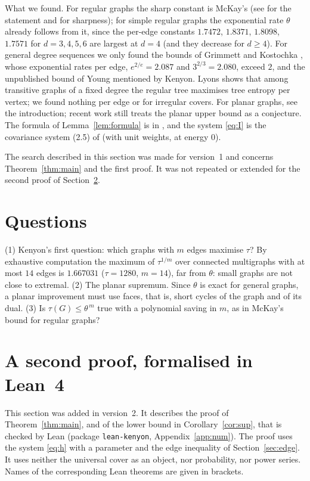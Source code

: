 \documentclass[11pt]{amsart}
\theoremstyle{plain}
\theoremstyle{remark}
\newcommand{\code}[1]{\texttt{#1}}
\newcommand{\tht}{\theta}
\begin{document}
What we found. For regular graphs the sharp constant is McKay's \cite{McKay} (see \cite{GIKM} for the statement
and \cite{ChungYau} for sharpness); for simple regular graphs the exponential rate $\tht$ already follows from it,
since the per-edge constants $1.7472$, $1.8371$, $1.8098$, $1.7571$ for $d=3,4,5,6$ are largest at $d=4$ (and they
decrease for $d\ge4$). For general
degree sequences we only found the bounds of Grimmett \cite{Grimmett} and Kostochka \cite{Kostochka}, whose
exponential rates per edge, $e^{2/e}=2.087$ and $3^{2/3}=2.080$, exceed $2$, and the unpublished bound of Young
mentioned by Kenyon. Lyons \cite{Lyons} shows that among transitive graphs
of a fixed degree the regular tree maximises tree entropy per vertex; we found nothing per edge or for irregular
covers. For planar graphs, see the introduction; recent work \cite{Burton,CK25} still treats the planar upper
bound as a conjecture. The formula of Lemma~\ref{lem:formula} is in \cite{BBGSS}, and the system \eqref{eq:I}
is the covariance system (2.5) of \cite{Watanabe} (with unit weights, at energy $0$).

The search described in this section was made for version~1 and concerns Theorem~\ref{thm:main} and the first
proof. It was not repeated or extended for the second proof of Section~\ref{sec:second}.

\section{Questions}

\textup{(1)} Kenyon's first question: which graphs with $m$ edges maximise $\tau$? By exhaustive computation the
maximum of $\tau^{1/m}$ over connected multigraphs with at most $14$ edges is $1.667031$ ($\tau=1280$, $m=14$), far
from $\tht$: small graphs are not close to extremal.
\textup{(2)} The planar supremum. Since $\tht$ is exact for general graphs, a planar improvement must use faces,
that is, short cycles of the graph and of its dual. \textup{(3)} Is $\tau(G)\le\tht^{\,m}$ true with a
polynomial saving in $m$, as in McKay's bound for regular graphs?

\section{A second proof, formalised in Lean~4}\label{sec:second}

This section was added in version~2. It describes the proof of Theorem~\ref{thm:main}, and of the lower bound in
Corollary~\ref{cor:sup}, that is checked by Lean (package \code{lean-kenyon}, Appendix~\ref{app:num}). The proof
uses the system \eqref{eq:h} with a parameter and the edge inequality of Section~\ref{sec:edge}. It uses neither
the universal cover as an object, nor probability, nor power series. Names of the corresponding Lean theorems
are given in brackets.
\end{document}
